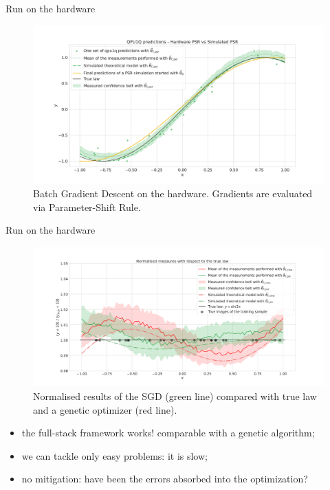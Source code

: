\documentclass[9pt, xcolor={svgnames}, hyperref={colorlinks, linkcolor=black, citecolor=amethyst, urlcolor=amethyst}]{beamer}
\begin{document}
\begin{frame}{Run on the hardware}
\small

    \begin{figure}  
    \includegraphics[width=1\textwidth]{figures/qpu1.pdf}
    \caption{Batch Gradient Descent on the hardware. Gradients are evaluated 
    via Parameter-Shift Rule.}
    \end{figure}

\end{frame}

\begin{frame}{Run on the hardware}
\small

    \begin{figure}  
    \includegraphics[width=1\textwidth]{figures/ratio_plot.pdf}
    \caption{Normalised results of the SGD (green line) compared with true law 
    and a genetic optimizer (red line).}
    \end{figure}

    \pause
    \begin{itemize}[noitemsep]
    \item[\faThumbsUp] the full-stack framework works! comparable with a genetic algorithm;
    \pause
    \item[\faThumbsDown] we can tackle only easy problems: it is slow;
    \pause
    \item[\faMehO] no mitigation: have been the errors absorbed into the optimization?
    \end{itemize}

\end{frame}
\end{document}
